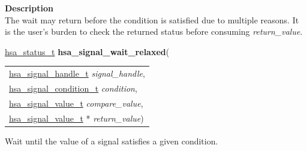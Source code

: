 \documentclass[final]{book}
\newcommand{\hsaarg}[1]{\textit{#1}}
\begin{document}
\vspace{-4mm}\noindent\textbf{Description}\\[1mm]
The wait may return before the condition is satisfied due to multiple reasons. It is the user's burden to check the returned status before consuming \textit{return_value}. 


\noindent\begin{tcolorbox}[breakable,nobeforeafter,colframe=white,colback=lightgray,left=0mm]
\hyperlink{group__status_1gad755322e7ff95456520e8abdbe90d225}{hsa_status_t} \hypertarget{group__signals_1ga328b24eb4b4633a1370834820d5bf9d2}{\textbf{hsa_signal_wait_relaxed}}(
\vspace{-3.5mm}\begin{longtable}{@{}p{\textwidth}}
\hspace{1.7em}\hyperlink{group__signals_1ga6592c136d70853d855bc11d9efdbf534}{hsa_signal_handle_t} \hsaarg{signal_handle},\\
\hspace{1.7em}\hyperlink{group__signals_1gab7190fcff48c6dbeded341389ed17c8d}{hsa_signal_condition_t} \hsaarg{condition},\\
\hspace{1.7em}\hyperlink{group__signals_1gacdf7a070a2f988bcf97904a1f5d0e573}{hsa_signal_value_t} \hsaarg{compare_value},\\
\hspace{1.7em}\hyperlink{group__signals_1gacdf7a070a2f988bcf97904a1f5d0e573}{hsa_signal_value_t} * \hsaarg{return_value})\end{longtable}

\end{tcolorbox}
Wait until the value of a signal satisfies a given condition.
\end{document}
